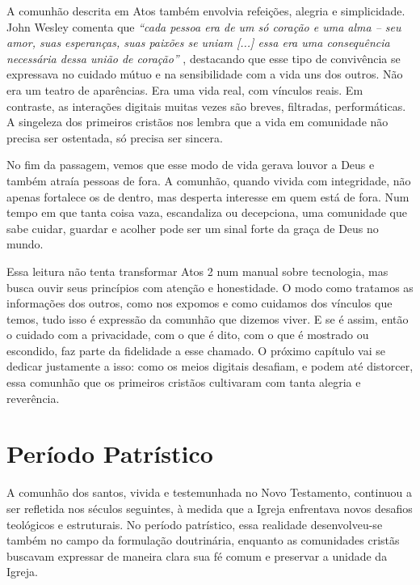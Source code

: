 A comunhão descrita em Atos também envolvia refeições, alegria e simplicidade. John Wesley comenta que \textit{``cada pessoa era de um só coração e uma alma – seu amor, suas esperanças, suas paixões se uniam [...] essa era uma consequência necessária dessa união de coração''} \cite{wesleyAtos4}, destacando que esse tipo de convivência se expressava no cuidado mútuo e na sensibilidade com a vida uns dos outros. Não era um teatro de aparências. Era uma vida real, com vínculos reais. Em contraste, as interações digitais muitas vezes são breves, filtradas, performáticas. A singeleza dos primeiros cristãos nos lembra que a vida em comunidade não precisa ser ostentada, só precisa ser sincera.

No fim da passagem, vemos que esse modo de vida gerava louvor a Deus e também atraía pessoas de fora. A comunhão, quando vivida com integridade, não apenas fortalece os de dentro, mas desperta interesse em quem está de fora. Num tempo em que tanta coisa vaza, escandaliza ou decepciona, uma comunidade que sabe cuidar, guardar e acolher pode ser um sinal forte da graça de Deus no mundo.

Essa leitura não tenta transformar Atos 2 num manual sobre tecnologia, mas busca ouvir seus princípios com atenção e honestidade. O modo como tratamos as informações dos outros, como nos expomos e como cuidamos dos vínculos que temos, tudo isso é expressão da comunhão que dizemos viver. E se é assim, então o cuidado com a privacidade, com o que é dito, com o que é mostrado ou escondido, faz parte da fidelidade a esse chamado. O próximo capítulo vai se dedicar justamente a isso: como os meios digitais desafiam, e podem até distorcer, essa comunhão que os primeiros cristãos cultivaram com tanta alegria e reverência.

\section{Período Patrístico}

A comunhão dos santos, vivida e testemunhada no Novo Testamento, continuou a ser refletida nos séculos seguintes, à medida que a Igreja enfrentava novos desafios teológicos e estruturais. No período patrístico, essa realidade desenvolveu-se também no campo da formulação doutrinária, enquanto as comunidades cristãs buscavam expressar de maneira clara sua fé comum e preservar a unidade da Igreja.


